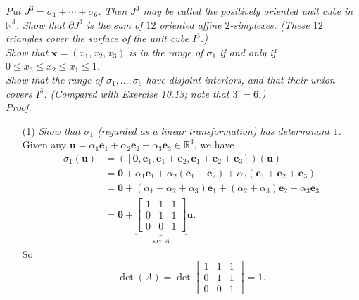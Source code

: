 \documentclass{article}
\begin{document}
\emph{Put $J^3 = \sigma_1+\cdots+\sigma_6$.
Then $J^3$ may be called the positively oriented unit cube in $\mathbb{R}^3$.
Show that $\partial J^3$ is the sum of $12$ oriented affine $2$-simplexes.
(These $12$ triangles cover the surface of the unit cube $I^3$.)} \\

\emph{Show that $\mathbf{x} = (x_1, x_2, x_3)$ is in the range of $\sigma_1$
if and only if $0 \leq x_3 \leq x_2 \leq x_1 \leq 1$.} \\

\emph{Show that the range of $\sigma_1, \ldots, \sigma_6$ have disjoint interiors,
and that their union covers $I^3$.
(Compared with Exercise 10.13; note that $3!=6$.)} \\

\emph{Proof.}
\begin{enumerate}
\item[(1)]
  \emph{Show that $\sigma_1$ (regarded as a linear transformation) has determinant $1$.}
  Given any $\mathbf{u}
  = \alpha_1 \mathbf{e}_1 + \alpha_2 \mathbf{e}_2 + \alpha_3 \mathbf{e}_3 \in \mathbb{R}^3$,
  we have
  \begin{align*}
    \sigma_1(\mathbf{u})
    &= ([\mathbf{0}, \mathbf{e}_1, \mathbf{e}_1+\mathbf{e}_2, \mathbf{e}_1+\mathbf{e}_2+\mathbf{e}_3])
    (\mathbf{u}) \\
    &= \mathbf{0}
      + \alpha_1 \mathbf{e}_1
      + \alpha_2 (\mathbf{e}_1+\mathbf{e}_2)
      + \alpha_3 (\mathbf{e}_1+\mathbf{e}_2+\mathbf{e}_3) \\
    &= \mathbf{0}
      + (\alpha_1+\alpha_2+\alpha_3) \mathbf{e}_1
      + (\alpha_2+\alpha_3) \mathbf{e}_2
      + \alpha_3 \mathbf{e}_3 \\
    &= \mathbf{0} +
      \underbrace{\begin{bmatrix}
        1 & 1 & 1 \\
        0 & 1 & 1 \\
        0 & 0 & 1
      \end{bmatrix}}_{\text{say }A}
      \mathbf{u}.
  \end{align*}
  So
  \[
    \det(A)
    =
    \det
    \begin{bmatrix}
      1 & 1 & 1 \\
      0 & 1 & 1 \\
      0 & 0 & 1
    \end{bmatrix}
    = 1.
  \]


\end{enumerate}
\end{document}
